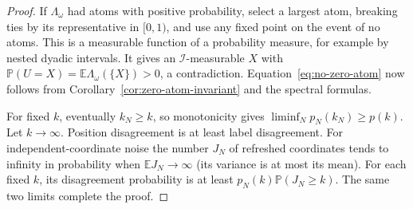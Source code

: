 \documentclass[11pt,letterpaper]{article}
\newcommand{\PP}{\mathbb P}\newcommand{\EE}{\mathbb E}
\begin{document}
\begin{proof}
If $\Lambda_\omega$ had atoms with positive probability, select a
largest atom, breaking ties by its representative in $[0,1)$, and
use any fixed point on the event of no atoms. This is a measurable
function of a probability measure, for example by nested dyadic
intervals. It gives an $\mathcal I$-measurable $X$ with
$\PP(U=X)=\EE\Lambda_\omega(\{X\})>0$, a contradiction.
Equation~\eqref{eq:no-zero-atom} now follows from
Corollary~\ref{cor:zero-atom-invariant} and the spectral formulas.

For fixed $k$, eventually $k_N\ge k$, so monotonicity gives
$\liminf_Np_N(k_N)\ge p(k)$. Let $k\to\infty$.
Position disagreement is at least label disagreement.
For independent-coordinate noise the number $J_N$ of refreshed
coordinates tends to infinity in probability when
$\EE J_N\to\infty$ (its variance is at most its mean).
For each fixed $k$, its disagreement probability is at least
$p_N(k)\PP(J_N\ge k)$. The same two limits complete the proof.
\end{proof}
\end{document}
